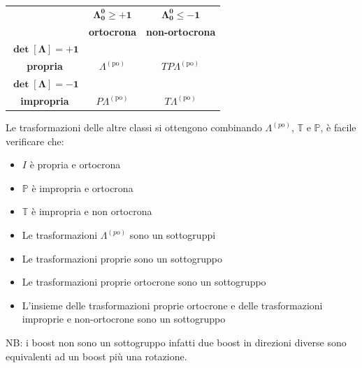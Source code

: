 \begin{tabular}{|c|c|c|}
	\hline
	& $\mathbf{\Lambda^0_0 \ge +1}$ & $\mathbf{\Lambda^0_0 \le -1}$ \\
	& \textbf{ortocrona} & \textbf{non-ortocrona} \\
	\hline
	$\mathbf{\det[\Lambda] = +1}$ & & \\
	\textbf{propria} & $\Lambda^{(\text{po})}$ & $T P \Lambda^{(\text{po})}$ \\
	\hline
	$\mathbf{\det[\Lambda] = -1}$ & & \\
	\textbf{impropria} & $P \Lambda^{(\text{po})}$ & $T \Lambda^{(\text{po})}$ \\
	\hline
\end{tabular}


Le trasformazioni delle altre classi si ottengono combinando $\Lambda^{(po)}$, $\mathbb{T}$ e $\mathbb{P}$, è facile verificare che:
\begin{itemize}
	\item $I$ è propria e ortocrona
	\item $\mathbb{P}$ è impropria e ortocrona
	\item $\mathbb{T}$ è impropria e non ortocrona
	\item Le trasformazioni $\Lambda^{(po)}$ sono un sottogruppi
	\item Le trasformazioni proprie sono un sottogruppo
	\item Le trasformazioni proprie ortocrone sono un sottogruppo
	\item L'insieme delle trasformazioni proprie ortocrone e delle trasformazioni improprie e non-ortocrone sono un sottogruppo
\end{itemize}
NB: i boost non sono un sottogruppo infatti due boost in direzioni diverse sono equivalenti ad un boost più una rotazione.

